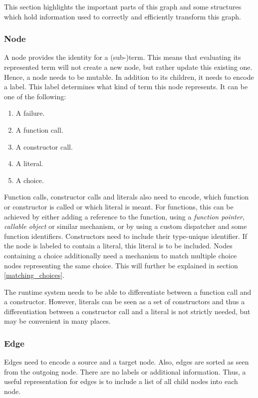 This section highlights the important parts of this graph and some structures which hold information used to correctly and efficiently transform this graph.

\subsubsection{Node}

A node provides the identity for a (sub-)term.
This means that evaluating its represented term will not create a new node, but rather update this existing one.
Hence, a node needs to be mutable.
In addition to its children, it needs to encode a label.
This label determines what kind of term this node represents.
It can be one of the following:
\begin{enumerate}
	\item A failure.
	\item A function call.
	\item A constructor call.
	\item A literal.
	\item A choice.
\end{enumerate}

Function calls, constructor calls and literals also need to encode, which function or constructor is called or which literal is meant.
For functions, this can be achieved by either adding a reference to the function, using a \emph{function pointer}, \emph{callable object} or similar mechanism, or by using a custom dispatcher and some function identifiers.
Constructors need to include their type-unique identifier.
If the node is labeled to contain a literal, this literal is to be included.
Nodes containing a choice additionally need a mechanism to match multiple choice nodes representing the same choice.
This will further be explained in section \ref{matching_choices}.

The runtime system needs to be able to differentiate between a function call and a constructor.
However, literals can be seen as a set of constructors and thus a differentiation between a constructor call and a literal is not strictly needed, but may be convenient in many places.

\subsubsection{Edge}

Edges need to encode a source and a target node.
Also, edges are sorted as seen from the outgoing node.
There are no labels or additional information.
Thus, a useful representation for edges is to include a list of all child nodes into each node.

